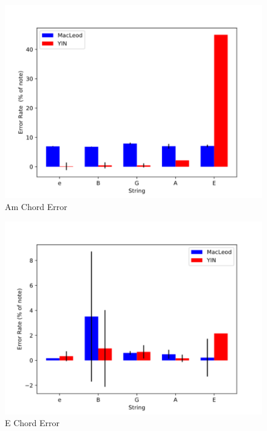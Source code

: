 \begin{figure}[!htpb]
  \centering
  \caption{Am Chord Error}
  \label{am-chord-error}
  \includegraphics[scale=0.85]{images/measurements/am-chord-error}
\end{figure}

\begin{figure}[!htpb]
  \centering
  \caption{E Chord Error}
  \label{e-chord-error}
  \includegraphics[scale=0.85]{images/measurements/e-chord-error}
\end{figure}

